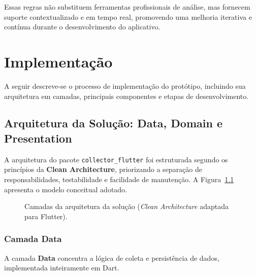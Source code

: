 \documentclass[12pt,a4paper,oneside]{abntex2}
\begin{document}
Essas regras não substituem ferramentas profissionais de análise, mas fornecem suporte contextualizado e em tempo real, promovendo uma melhoria iterativa e contínua durante o desenvolvimento do aplicativo.


\chapter{Implementação}

A seguir descreve-se o processo de implementação do protótipo, incluindo sua arquitetura em camadas, principais componentes e etapas de desenvolvimento.

\section{Arquitetura da Solução: Data, Domain e Presentation}

A arquitetura do pacote \texttt{collector\_flutter} foi estruturada segundo os princípios da \textbf{Clean Architecture}, priorizando a separação de responsabilidades, testabilidade e facilidade de manutenção. A Figura~\ref{fig:camadas} apresenta o modelo conceitual adotado.

\begin{figure}[H]
\centering
{}
\caption{Camadas da arquitetura da solução (\textit{Clean Architecture} adaptada para Flutter).}
\label{fig:camadas}
\end{figure}

\subsection{Camada Data}

A camada \textbf{Data} concentra a lógica de coleta e persistência de dados, implementada inteiramente em Dart.  
\end{document}
